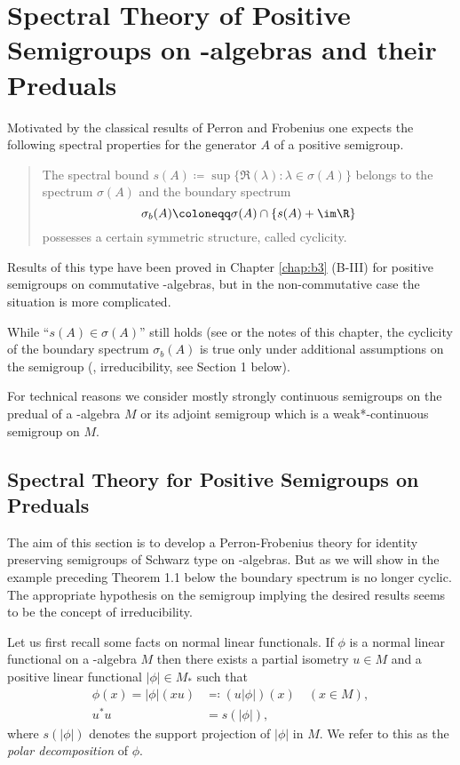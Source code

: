\setcounter{chapter}{2}		%
\setcounter{section}{1}		%
\chapter{Spectral Theory of Positive Semigroups on \WA-algebras and their Preduals}\label{chap:D-III}
Motivated by the classical results of Perron and Frobenius one expects the following spectral properties for the generator $A$ of a positive semigroup.
\begin{quote}
The spectral bound 
$s(A) \coloneqq \sup\{\Re(\lambda) \colon \lambda \in \sigma(A)\}$ belongs to the spectrum $\sigma(A)$ and the boundary spectrum
\[
\sigma_{b}(A) \coloneqq \sigma(A) \cap \{s(A)+\im\R\}
\]
possesses a certain symmetric structure, called cyclicity.
\end{quote}
Results of this type have been proved in Chapter \ref{chap:b3} (B-III) for positive semigroups on commutative \CA-algebras, but in the non-commutative case the situation is more complicated.

While \enquote{$s(A) \in \sigma(A)$} still holds (see \citet{greinervoigtwolff:1980} %
or the notes of this chapter, the cyclicity of the boundary spectrum $\sigma_{b}(A)$ is true only under additional assumptions on the semigroup (\eg, irreducibility, see Section 1 below).

For technical reasons we consider mostly strongly continuous semigroups on the predual of a \WA-algebra $M$ or its adjoint semigroup which is a weak*-continuous semigroup on $M$.
\section{Spectral Theory for Positive Semigroups on Preduals}\label{sec:d3-1}
The aim of this section is to develop a Perron-Frobenius theory for identity preserving semigroups of Schwarz type on \WA-algebras.
But as we will show in the example preceding Theorem 1.1 below the boundary spectrum is no longer cyclic.
The appropriate hypothesis on the semigroup implying the desired results seems to be the concept of irreducibility.

Let us first recall some facts on normal linear functionals.
If $\phi$ is a normal linear functional on a \WA-algebra $M$ then there exists a partial isometry $u \in M$ and a positive linear functional $|\phi| \in M_{*}$ such that
\begin{align*}
	\phi(x) = |\phi|(xu) & \eqqcolon  (u|\phi|)(x) \quad (x \in M), \\
	u^{*}u  &= s(|\phi|),
\end{align*}
where $s(|\phi|)$ denotes the support projection of $|\phi|$ in $M$.
We refer to this as the \emph{polar decomposition} of $\phi$.

